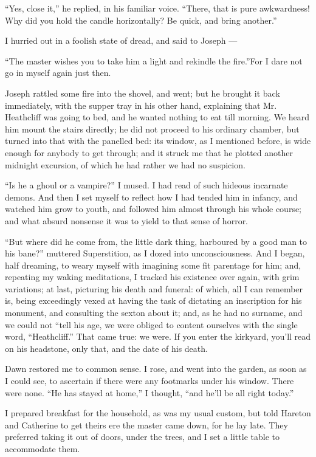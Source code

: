 \par “Yes, close it,” he replied, in his familiar voice. “There, that is pure awkwardness! Why did you hold the candle horizontally? Be quick, and bring another.”
\par I hurried out in a foolish state of dread, and said to Joseph —
\par “The master wishes you to take him a light and rekindle the fire.”For I dare not go in myself again just then.
\par Joseph rattled some fire into the shovel, and went; but he brought it back immediately, with the supper tray in his other hand, explaining that Mr. Heathcliff was going to bed, and he wanted nothing to eat till morning. We heard him mount the stairs directly; he did not proceed to his ordinary chamber, but turned into that with the panelled bed: its window, as I mentioned before, is wide enough for anybody to get through; and it struck me that he plotted another midnight excursion, of which he had rather we had no suspicion.
\par “Is he a ghoul or a vampire?” I mused. I had read of such hideous incarnate demons. And then I set myself to reflect how I had tended him in infancy, and watched him grow to youth, and followed him almost through his whole course; and what absurd nonsense it was to yield to that sense of horror.
\par “But where did he come from, the little dark thing, harboured by a good man to his bane?” muttered Superstition, as I dozed into unconsciousness. And I began, half dreaming, to weary myself with imagining some fit parentage for him; and, repeating my waking meditations, I tracked his existence over again, with grim variations; at last, picturing his death and funeral: of which, all I can remember is, being exceedingly vexed at having the task of dictating an inscription for his monument, and consulting the sexton about it; and, as he had no surname, and we could not “tell his age, we were obliged to content ourselves with the single word, “Heathcliff.” That came true: we were. If you enter the kirkyard, you'll read on his headstone, only that, and the date of his death.
\par Dawn restored me to common sense. I rose, and went into the garden, as soon as I could see, to ascertain if there were any footmarks under his window. There were none. “He has stayed at home,” I thought, “and he'll be all right today.”
\par I prepared breakfast for the household, as was my usual custom, but told Hareton and Catherine to get theirs ere the master came down, for he lay late. They preferred taking it out of doors, under the trees, and I set a little table to accommodate them.
